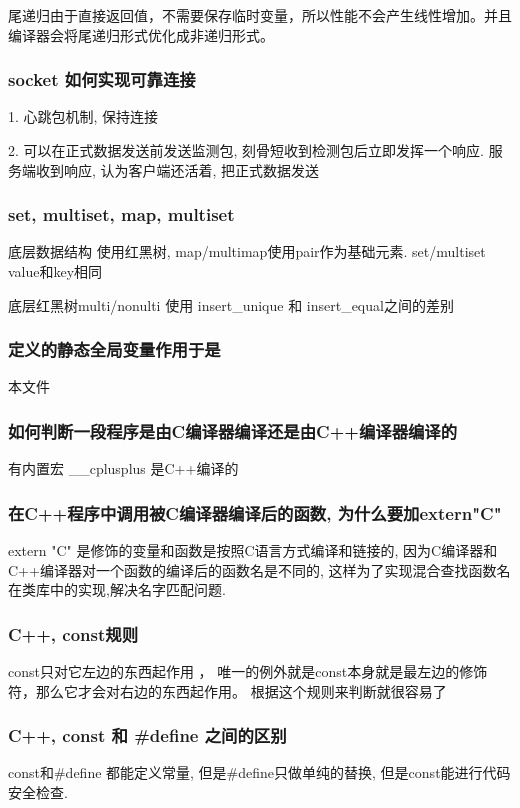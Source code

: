 \documentclass[UTF8]{ctexart}
\begin{document}
尾递归由于直接返回值，不需要保存临时变量，所以性能不会产生线性增加。并且编译器会将尾递归形式优化成非递归形式。


\subsubsection{socket 如何实现可靠连接}
1. 心跳包机制, 保持连接

2. 可以在正式数据发送前发送监测包, 刻骨短收到检测包后立即发挥一个响应. 服务端收到响应, 认为客户端还活着, 把正式数据发送


\subsubsection{set, multiset, map, multiset}
底层数据结构 使用红黑树, map/multimap使用pair作为基础元素. set/multiset value和key相同 \par
底层红黑树multi/nonulti 使用 insert\_unique 和 insert\_equal之间的差别 \par
\subsubsection{定义的静态全局变量作用于是}
本文件
\subsubsection{如何判断一段程序是由C编译器编译还是由C++编译器编译的}
有内置宏 \_\_cplusplus 是C++编译的
\subsubsection{在C++程序中调用被C编译器编译后的函数, 为什么要加extern"C"}
extern "C" 是修饰的变量和函数是按照C语言方式编译和链接的, 因为C编译器和C++编译器对一个函数的编译后的函数名是不同的, 这样为了实现混合查找函数名在类库中的实现,解决名字匹配问题. \par

\subsubsection{C++, const规则}
const只对它左边的东西起作用 ，  唯一的例外就是const本身就是最左边的修饰符，那么它才会对右边的东西起作用。 根据这个规则来判断就很容易了
\subsubsection{C++, const 和 \#define 之间的区别}
const和\#define 都能定义常量, 但是\#define只做单纯的替换, 但是const能进行代码安全检查.
\end{document}
